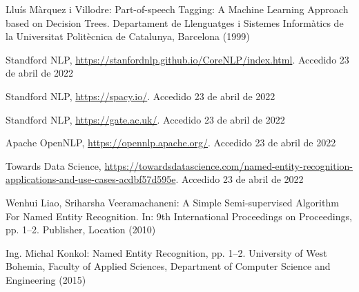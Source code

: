 \documentclass[runningheads]{llncs}
\begin{document}
\begin{thebibliography}{8}
Lluís Màrquez i Villodre: Part-of-speech Tagging: A Machine Learning Approach based on Decision Trees. Departament de Llenguatges i Sistemes Informàtics de la Universitat Politècnica de Catalunya, Barcelona (1999)

Standford NLP, \url{https://stanfordnlp.github.io/CoreNLP/index.html}. Accedido 23 de abril de 2022

Standford NLP, \url{https://spacy.io/}. Accedido 23 de abril de 2022

Standford NLP, \url{https://gate.ac.uk/}. Accedido 23 de abril de 2022

Apache OpenNLP, \url{https://opennlp.apache.org/}. Accedido 23 de abril de 2022

Towards Data Science, \url{https://towardsdatascience.com/named-entity-recognition-applications-and-use-cases-acdbf57d595e}. Accedido 23 de abril de 2022

Wenhui Liao, Sriharsha Veeramachaneni: A Simple Semi-supervised Algorithm For
Named Entity Recognition. In: 9th International Proceedings
on Proceedings, pp. 1--2. Publisher, Location (2010)

Ing. Michal Konkol: Named Entity Recognition, pp. 1--2. University of West Bohemia, Faculty of Applied Sciences, Department of Computer Science and Engineering (2015)


\end{thebibliography}
\end{document}
